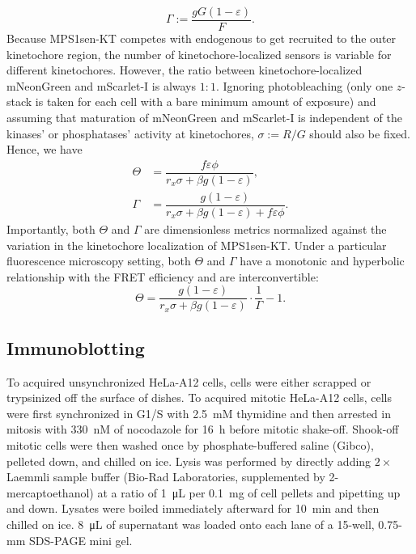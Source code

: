\begin{equation*}
    \Gamma := \dfrac{gG(1 - \varepsilon)}{F}.
\end{equation*}
Because MPS1sen-KT competes with endogenous  to get recruited to the outer kinetochore region, the number of kinetochore-localized sensors is variable for different kinetochores. However, the ratio between kinetochore-localized mNeonGreen and mScarlet-I is always $1 : 1$. Ignoring photobleaching (only one $z$-stack is taken for each cell with a bare minimum amount of exposure) and assuming that maturation of mNeonGreen and mScarlet-I is independent of the kinases' or phosphatases' activity at kinetochores, $\sigma := R/G$ should also be fixed. Hence, we have
\begin{align*}
    \Theta &= \dfrac{f\varepsilon\phi}{r_x\sigma + \beta g(1 - \varepsilon)},\\
    \Gamma &= \dfrac{g(1 - \varepsilon)}{r_x\sigma + \beta g(1 - \varepsilon) + f\varepsilon\phi}.
\end{align*}
Importantly, both $\Theta$ and $\Gamma$ are dimensionless metrics normalized against the variation in the kinetochore localization of MPS1sen-KT. Under a particular fluorescence microscopy setting, both $\Theta$ and $\Gamma$ have a monotonic and hyperbolic relationship with the FRET efficiency and are interconvertible:
\begin{equation*}
    \Theta = \dfrac{g(1 - \varepsilon)}{r_x\sigma + \beta g(1 - \varepsilon)}\cdot\dfrac{1}{\Gamma} - 1.
\end{equation*}

\subsection{Immunoblotting}
\label{WBMethods}
To acquired unsynchronized HeLa-A12 cells, cells were either scrapped or trypsinized off the surface of dishes. To acquired mitotic HeLa-A12 cells, cells were first synchronized in G1/S with \SI{2.5}{mM} thymidine and then arrested in mitosis with \SI{330}{nM} of nocodazole for \SI{16}{h} before mitotic shake-off. Shook-off mitotic cells were then washed once by phosphate-buffered saline (Gibco), pelleted down, and chilled on ice. Lysis was performed by directly adding $2 \times$ Laemmli sample buffer (Bio-Rad Laboratories, supplemented by 2-mercaptoethanol) at a ratio of \SI{1}{\micro L} per \SI{0.1}{mg} of cell pellets and pipetting up and down. Lysates were boiled immediately afterward for \SI{10}{min} and then chilled on ice. \SI{8}{\micro L} of supernatant was loaded onto each lane of a 15-well, 0.75-mm SDS-PAGE mini gel.

